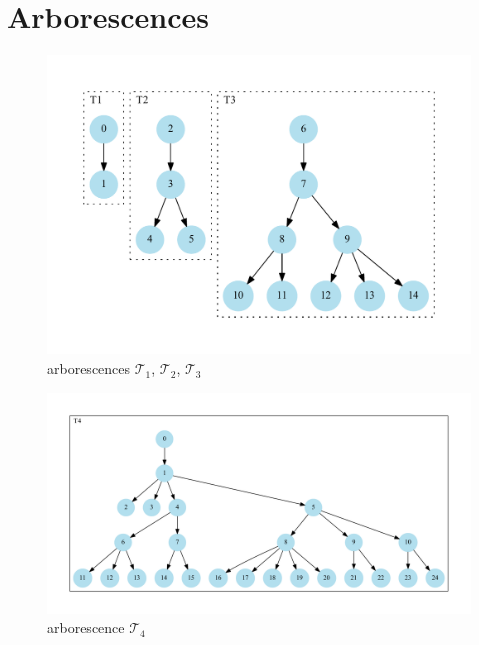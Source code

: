 \chapter{Arborescences}\label{arbo}

\begin{figure}[h]
\begin{center}
\includegraphics[scale=0.6]{./images/t1_2_3.pdf}
\end{center}
\caption{arborescences $\mathcal{T}_1$, $\mathcal{T}_2$, $\mathcal{T}_3$}
\end{figure}
\clearpage

\begin{figure}[h]
\begin{center}
\includegraphics[scale=0.4]{./images/t4.pdf}
\end{center}
\caption{arborescence $\mathcal{T}_4$}
\end{figure}
\clearpage